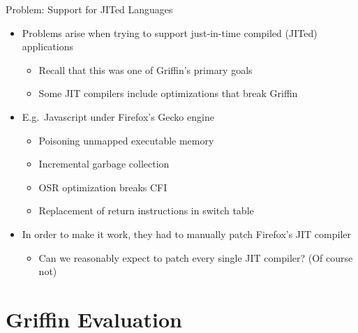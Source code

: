 \documentclass[12pt, dvipsnames, aspectratio=169]{beamer}
\begin{document}
\begin{frame}[c]{Problem: Support for JITed Languages}{}
  \begin{itemize}
    \item Problems arise when trying to support just-in-time compiled (JITed) applications
    \begin{itemize}
      \item Recall that this was one of Griffin's primary goals
      \item Some JIT compilers include optimizations that break Griffin
    \end{itemize}

    \vfill
    \item E.g.~Javascript under Firefox's Gecko engine
    \begin{itemize}
      \item Poisoning unmapped executable memory
      \item Incremental garbage collection
      \item OSR optimization breaks CFI
      \item Replacement of return instructions in switch table
    \end{itemize}

    \vfill
    \item In order to make it work, they had to manually patch Firefox's JIT compiler
    \begin{itemize}
      \item Can we reasonably expect to patch every single JIT compiler? (Of course not)
    \end{itemize}
  \end{itemize}
\end{frame}

\section{Griffin Evaluation}
\end{document}
